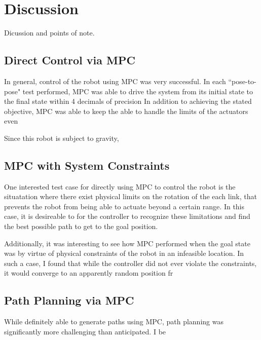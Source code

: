 \documentclass[journal]{IEEEtran}
\begin{document}
\subsection{}

\section{Discussion}

Dicussion and points of note.


\subsection{Direct Control via MPC}

In general, control of the robot using MPC was very successful. In each ``pose-to-pose" test performed, MPC was able to drive the system from its initial state to the final state within 4 decimals of precision In addition to achieving the stated objective, MPC was able to keep the able to handle the limits of the actuators even

Since this robot is subject to gravity,

\subsection{MPC with System Constraints}

One interested test case for directly using MPC to control the robot is the situatation where there exist physical limits on the rotation of the each link, that prevents the robot from being able to actuate beyond a certain range. In this case, it is desireable to for the controller to recognize these limitations and find the best possible path to get to the goal position.





Additionally, it was interesting to see how MPC performed when the goal state was by virtue of physical constraints of the robot in an infeasible location. In such a case, I found that while the controller did not ever violate the constraints, it would converge to an apparently random position fr


\subsection{Path Planning via MPC}

While definitely able to generate paths using MPC, path planning was significantly more challenging than anticipated. I be
\end{document}
